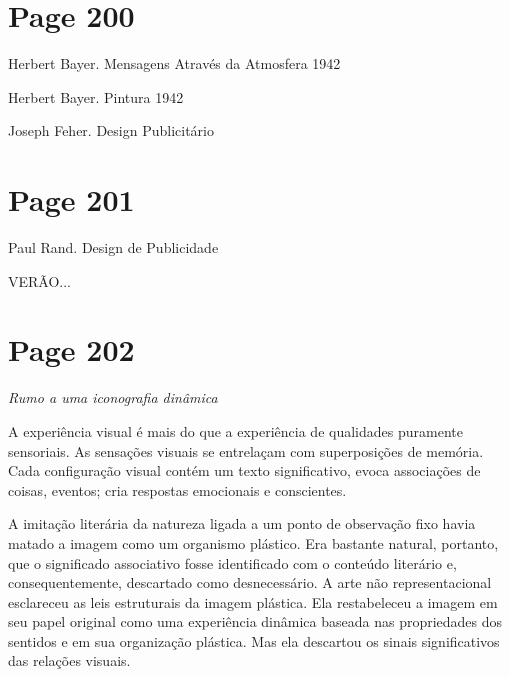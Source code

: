 \documentclass[a4paper]{article}
\begin{document}
\newpage
\section*{Page 200}

Herbert Bayer. Mensagens Através da Atmosfera 1942

\vspace*{0.15\textheight}

\noindent\hspace*{0.55\textwidth} Herbert Bayer. Pintura 1942

\vspace*{0.12\textheight}

\noindent\hspace*{0.55\textwidth} Joseph Feher. Design Publicitário

\vfill


\newpage
\section*{Page 201}

Paul Rand. Design de Publicidade

VERÃO...

\newpage
\section*{Page 202}

\centering\textit{Rumo a uma iconografia dinâmica}\par

\bigskip

A experiência visual é mais do que a experiência de qualidades puramente sensoriais. As sensações visuais se entrelaçam com superposições de memória. Cada configuração visual contém um texto significativo, evoca associações de coisas, eventos; cria respostas emocionais e conscientes.

A imitação literária da natureza ligada a um ponto de observação fixo havia matado a imagem como um organismo plástico. Era bastante natural, portanto, que o significado associativo fosse identificado com o conteúdo literário e, consequentemente, descartado como desnecessário. A arte não representacional esclareceu as leis estruturais da imagem plástica. Ela restabeleceu a imagem em seu papel original como uma experiência dinâmica baseada nas propriedades dos sentidos e em sua organização plástica. Mas ela descartou os sinais significativos das relações visuais.
\end{document}
